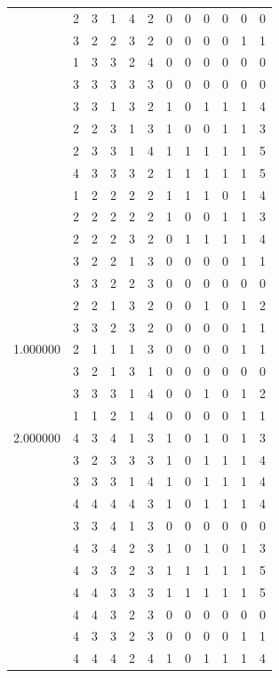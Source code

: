 \documentclass[]{book}
\theoremstyle{definition}
\theoremstyle{definition}
\theoremstyle{definition}
\theoremstyle{remark}
\begin{document}
\begin{table}
{\begin{tabular}[t]{rrrrrrrrrrrr}
 & 2 & 3 & 1 & 4 & 2 & 0 & 0 & 0 & 0 & 0 & 0\\
 & 3 & 2 & 2 & 3 & 2 & 0 & 0 & 0 & 0 & 1 & 1\\
 & 1 & 3 & 3 & 2 & 4 & 0 & 0 & 0 & 0 & 0 & 0\\
 & 3 & 3 & 3 & 3 & 3 & 0 & 0 & 0 & 0 & 0 & 0\\
 & 3 & 3 & 1 & 3 & 2 & 1 & 0 & 1 & 1 & 1 & 4\\
 & 2 & 2 & 3 & 1 & 3 & 1 & 0 & 0 & 1 & 1 & 3\\
 & 2 & 3 & 3 & 1 & 4 & 1 & 1 & 1 & 1 & 1 & 5\\
 & 4 & 3 & 3 & 3 & 2 & 1 & 1 & 1 & 1 & 1 & 5\\
 & 1 & 2 & 2 & 2 & 2 & 1 & 1 & 1 & 0 & 1 & 4\\
 & 2 & 2 & 2 & 2 & 2 & 1 & 0 & 0 & 1 & 1 & 3\\
 & 2 & 2 & 2 & 3 & 2 & 0 & 1 & 1 & 1 & 1 & 4\\
 & 3 & 2 & 2 & 1 & 3 & 0 & 0 & 0 & 0 & 1 & 1\\
 & 3 & 3 & 2 & 2 & 3 & 0 & 0 & 0 & 0 & 0 & 0\\
 & 2 & 2 & 1 & 3 & 2 & 0 & 0 & 1 & 0 & 1 & 2\\
 & 3 & 3 & 2 & 3 & 2 & 0 & 0 & 0 & 0 & 1 & 1\\
1.000000 & 2 & 1 & 1 & 1 & 3 & 0 & 0 & 0 & 0 & 1 & 1\\
 & 3 & 2 & 1 & 3 & 1 & 0 & 0 & 0 & 0 & 0 & 0\\
 & 3 & 3 & 3 & 1 & 4 & 0 & 0 & 1 & 0 & 1 & 2\\
 & 1 & 1 & 2 & 1 & 4 & 0 & 0 & 0 & 0 & 1 & 1\\
2.000000 & 4 & 3 & 4 & 1 & 3 & 1 & 0 & 1 & 0 & 1 & 3\\
 & 3 & 2 & 3 & 3 & 3 & 1 & 0 & 1 & 1 & 1 & 4\\
 & 3 & 3 & 3 & 1 & 4 & 1 & 0 & 1 & 1 & 1 & 4\\
 & 4 & 4 & 4 & 4 & 3 & 1 & 0 & 1 & 1 & 1 & 4\\
 & 3 & 3 & 4 & 1 & 3 & 0 & 0 & 0 & 0 & 0 & 0\\
 & 4 & 3 & 4 & 2 & 3 & 1 & 0 & 1 & 0 & 1 & 3\\
 & 4 & 3 & 3 & 2 & 3 & 1 & 1 & 1 & 1 & 1 & 5\\
 & 4 & 4 & 3 & 3 & 3 & 1 & 1 & 1 & 1 & 1 & 5\\
 & 4 & 4 & 3 & 2 & 3 & 0 & 0 & 0 & 0 & 0 & 0\\
 & 4 & 3 & 3 & 2 & 3 & 0 & 0 & 0 & 0 & 1 & 1\\
 & 4 & 4 & 4 & 2 & 4 & 1 & 0 & 1 & 1 & 1 & 4\\

\end{tabular}}
\end{table}
\end{document}
